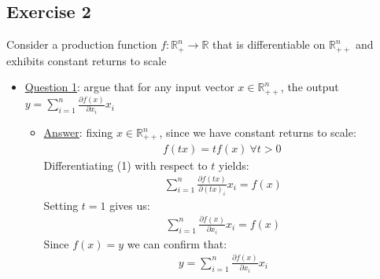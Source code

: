 \documentclass{article}
\begin{document}
\subsection{Exercise 2}
Consider a production function $f: \mathbb{R}_{+}^{n} \rightarrow \mathbb{R}$ that is differentiable on $\mathbb{R}_{++}^{n}$ and exhibits constant returns to scale \par \vspace{0.3em}
  \begin{itemize}
    \item  \underline{Question 1}: argue that for any input vector $x \in \mathbb{R}_{++}^{n}$, the output $y = \sum_{i=1}^{n} \tfrac{\partial f(x)}{\partial x_{i}} x_{i}$
    \begin{itemize}
      \item  \underline{Answer}: fixing $x \in \mathbb{R}_{++}^{n}$, since we have constant returns to scale:
      \begin{gather*}
        f(tx) = tf(x) \ \forall t >0 \ \tag{1}
      \end{gather*}
      Differentiating (1) with respect to $t$ yields:
      \begin{gather*}
        \sum_{i=1}^{n} \frac{\partial f(tx)}{\partial (tx)_{i}} x_{i} = f(x)
      \end{gather*}
      Setting $t=1$ gives us:
      \begin{gather*}
        \sum_{i=1}^{n} \frac{\partial f(x)}{\partial x_{i}} x_{i} = f(x)
      \end{gather*}
      Since $f(x) = y$ we can confirm that:
      \begin{gather*}
        y = \sum_{i=1}^{n} \frac{\partial f(x)}{\partial x_{i}} x_{i}
      \end{gather*}
    \end{itemize}
  \end{itemize}
\end{document}
